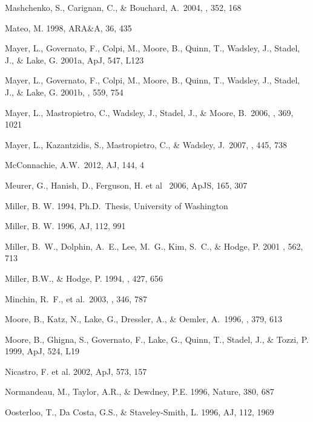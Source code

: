 \documentclass[12pt,preprint]{emulateapj}
\begin{document}
\begin{thebibliography}{}
Mashchenko, S., Carignan, C., \& Bouchard, A.\ 2004, \mnras, 352, 168 

Mateo, M. 1998, ARA\&A, 36, 435

Mayer, L., Governato, F., Colpi, M., Moore, B., Quinn, T., Wadsley, J., 
Stadel, J., \& Lake, G. 2001a, ApJ, 547, L123

Mayer, L., Governato, F., Colpi, M., Moore, B., Quinn, T., Wadsley, J., 
Stadel, J., \& Lake, G. 2001b, \apj, 559, 754 

Mayer, L., Mastropietro, C., Wadsley, J., Stadel, J., \& 
   Moore, B.\ 2006, \mnras, 369, 1021

Mayer, L., Kazantzidis, S., Mastropietro, C., \& Wadsley, J.\ 2007, \nat, 445, 738 

McConnachie, A.W.\ 2012, AJ, 144, 4 

Meurer, G., Hanish, D., Ferguson, H. et al \ 2006, ApJS, 165, 307 

Miller, B. W. 1994, Ph.D.\ Thesis, University of Washington

Miller, B. W. 1996, AJ, 112, 991 

Miller, B.~W., Dolphin, A.~E., Lee, M.~G., Kim, S.~C., \& Hodge, P. 2001
\apj , 562, 713

Miller, B.W., \& Hodge, P. 1994, \apj , 427, 656

Minchin, R.~F., et al.\ 2003, \mnras, 346, 787 

Moore, B., Katz, N., Lake, G., Dressler, A., \& Oemler, A.\ 1996, \nat, 379, 613 

Moore, B., Ghigna, S., Governato, F., Lake, G., Quinn, T., Stadel, J., \&
Tozzi, P. 1999, ApJ, 524, L19

Nicastro, F. et al. 2002, ApJ, 573, 157

Normandeau, M., Taylor, A.R., \& Dewdney, P.E. 1996, Nature, 380, 687

Oosterloo, T., Da Costa, G.S., \& Staveley-Smith, L. 1996, AJ, 112, 1969


\end{thebibliography}
\end{document}
